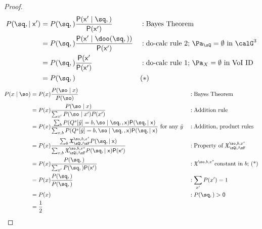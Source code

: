 \begin{proof}
\begin{align*}
    P(\sq,\sf\mid x') &= P(\sq,\sf) \frac{P(x'\mid \sq,\sf)}{P(x')} && : \text{Bayes Theorem} \\
    &= P(\sq,\sf) \frac{P(x' \mid \doo(\sq,\sf))}{P(x')} && :\text{do-calc rule 2; $\Pa_{\sQ}=\emptyset$ in $\calG^3$} \\
    &= P(\sq,\sf) \frac{P(x'}{P(x')} && :\text{do-calc rule 1; $\Pa_{X}=\emptyset$ in VoI ID} \\
    &= P(\sq,\sf) && (*)
\end{align*}
\begin{align*}
P(x \mid \so) &= P(x) \frac{P(\so\mid x)}{P(\so)} && : \text{Bayes Theorem} \\
 &= P(x) \frac{P(\so\mid x)}{\sum_{x'}P(\so\mid x')P(x')} && : \text{Addition rule} \\
 &= P(x) \frac{\sum_b P(Q^s[\tilde y]=b,\so \mid \sq,\sf,x) P(\sq,\sf \mid x)}{\sum_{x,b} P(Q^s[\tilde y]=b,\so \mid \sq,\sf,x) P(\sq,\sf \mid x)} \text{ for any } \tilde y && : \text{Addition, product rules} \\
&=P(x) \frac{\sum_b \mathfrak{X}^{\so,b,x^s}_{\sQ \cup \sF} P(\sq,\sf \mid x)}{\sum_{x,b}  \mathfrak{X}^{\so,b,x^s}_{\sQ \cup \sF} P(\sq,\sf \mid x)P(x')} && : \text{Property of $\mathfrak{X}^{\so,b,x^s}_{\sQ \cup \sF}$} \\
&=P(x) \frac{P(\sq,\sf)}{\sum_{x'} P(\sq,\sf)P(x')} && :\mathfrak{X}^{\so,b,x^s}\text{constant in $b$; (*)} \\
&=P(x) \frac{P(\sq,\sf)}{P(\sq,\sf)} &&: \sum_{x'} P(x')=1 \\
&=P(x) && :\text{$P(\sq,\sf)>0$} \\
&= \frac{1}{2}
\end{align*}


\end{proof}



